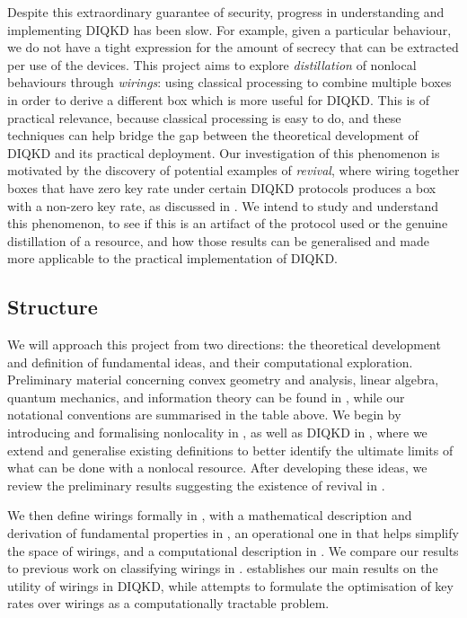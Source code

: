 \documentclass[10pt, a4paper]{article}
\numberwithin{equation}{section} %
\theoremstyle{definition}
\theoremstyle{plain}
\newcommand{\?}{\mathrel{?}} %
\begin{document}
    Despite this extraordinary guarantee of security, progress in understanding and implementing DIQKD has been slow. For example, given a particular behaviour, we do not have a tight expression for the amount of secrecy that can be extracted per use of the devices. This project aims to explore \emph{distillation} of nonlocal behaviours through \emph{wirings}: using classical processing to combine multiple boxes in order to derive a different box which is more useful for DIQKD\@. This is of practical relevance, because classical processing is easy to do, and these techniques can help bridge the gap between the theoretical development of DIQKD and its practical deployment. Our investigation of this phenomenon is motivated by the discovery of potential examples of \emph{revival}, where wiring together boxes that have zero key rate under certain DIQKD protocols produces a box with a non-zero key rate, as discussed in . We intend to study and understand this phenomenon, to see if this is an artifact of the protocol used or the genuine distillation of a resource, and how those results can be generalised and made more applicable to the practical implementation of DIQKD\@.

    \subsection{Structure}

    We will approach this project from two directions: the theoretical development and definition of fundamental ideas, and their computational exploration. Preliminary material concerning convex geometry and analysis, linear algebra, quantum mechanics, and information theory can be found in , while our notational conventions are summarised in the table above. We begin by introducing and formalising nonlocality in , as well as DIQKD in , where we extend and generalise existing definitions to better identify the ultimate limits of what can be done with a nonlocal resource. After developing these ideas, we review the preliminary results suggesting the existence of revival in .

    We then define wirings formally in , with a mathematical description and derivation of fundamental properties in , an operational one in  that helps simplify the space of wirings, and a computational description in . We compare our results to previous work on classifying wirings in .  establishes our main results on the utility of wirings in DIQKD, while  attempts to formulate the optimisation of key rates over wirings as a computationally tractable problem.
\end{document}
